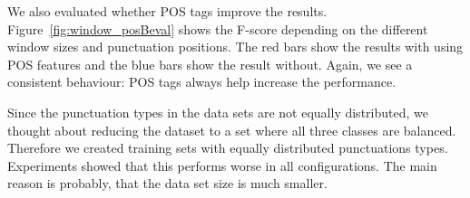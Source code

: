 We also evaluated whether POS tags improve the results.
Figure~\ref{fig:window_posBeval} shows the F-score depending on the different window sizes and punctuation positions.
The red bars show the results with using POS features and the blue bars show the result without.
Again, we see a consistent behaviour: POS tags always help increase the performance.

Since the punctuation types in the data sets are not equally distributed, we thought about reducing the dataset to a set where all three classes are balanced.
Therefore we created training sets with equally distributed punctuations types.
Experiments showed that this performs worse in all configurations.
The main reason is probably, that the data set size is much smaller.
